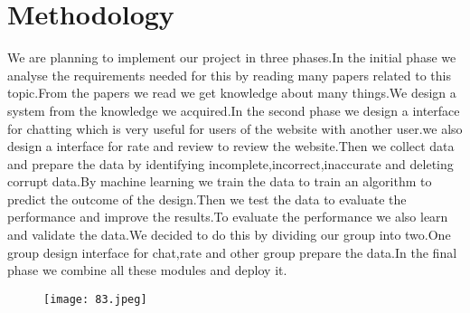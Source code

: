 \chapter{Methodology}
We are planning to implement our project in three phases.In the initial phase we analyse the requirements needed for this by reading many papers related to this topic.From the papers we read we get knowledge about many things.We design a system from the knowledge we acquired.In the second phase we design a interface for chatting which is very useful for users of the website with another user.we also design a interface for rate and review to review the website.Then we collect data and prepare the data by identifying incomplete,incorrect,inaccurate and deleting corrupt data.By machine learning we train the data to train an algorithm to predict the outcome of the design.Then we test the data to evaluate the performance and improve the results.To evaluate the performance we also learn and validate the data.We decided to do this by dividing our group into two.One group design interface for chat,rate and other group prepare the data.In the final phase we combine all these modules and deploy it.
\pagebreak


\begin{figure}
\centering
\texttt{[image: 83.jpeg]}
\label{}
\end{figure}


